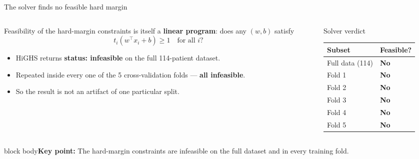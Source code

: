 \documentclass[aspectratio=169,11pt]{beamer}
\newcommand{\take}[1]{\vspace{0.3em}\begin{beamercolorbox}[wd=\textwidth,sep=6pt,rounded=true]{block body}\color{darkink}\small\textbf{Key point:} #1\end{beamercolorbox}}
\begin{document}
\begin{frame}{The solver finds no feasible hard margin}
  \small
  \begin{columns}[T]
    \begin{column}{0.52\textwidth}
      Feasibility of the hard-margin constraints is itself a \textbf{linear program}: does any $(w,b)$ satisfy
      \[
        t_i(w^\top x_i + b)\ge 1 \quad\text{for all } i?
      \]
      \begin{itemize}
        \item HiGHS returns \alert{\textbf{status: infeasible}} on the full 114-patient dataset.
        \item Repeated inside every one of the 5 cross-validation folds --- \textbf{all infeasible}.
        \item So the result is not an artifact of one particular split.
      \end{itemize}
    \end{column}
    \begin{column}{0.48\textwidth}
      \centering
      \begin{block}{Solver verdict}
        \footnotesize
        \begin{tabular}{ll}
          \toprule
          Subset & Feasible? \\
          \midrule
          Full data (114) & \textcolor{BPAorange}{\textbf{No}} \\
          Fold 1 & \textcolor{BPAorange}{\textbf{No}} \\
          Fold 2 & \textcolor{BPAorange}{\textbf{No}} \\
          Fold 3 & \textcolor{BPAorange}{\textbf{No}} \\
          Fold 4 & \textcolor{BPAorange}{\textbf{No}} \\
          Fold 5 & \textcolor{BPAorange}{\textbf{No}} \\
          \bottomrule
        \end{tabular}
      \end{block}
    \end{column}
  \end{columns}
  \take{The hard-margin constraints are infeasible on the full dataset and in every training fold.}
\end{frame}
\end{document}
